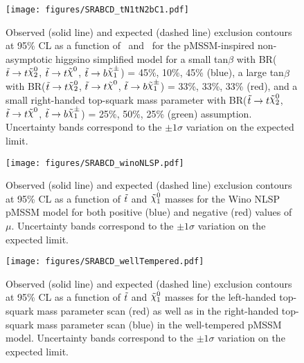\begin{figure}[htpb]
  \begin{center}
   \texttt{[image: figures/SRABCD\_tN1tN2bC1.pdf]}
    \caption[Exclusion contours for the pMSSM-inspired non-asymptotic higgsino simplified model.]{Observed (solid line) and expected (dashed line) exclusion contours at 95\% CL as a function of \mstop\ and \mLSP\ for the pMSSM-inspired non-asymptotic higgsino simplified model for a small tan$\beta$ with BR($\stop\to t\ninotwo$, $\stop\to t\LSP$, $\stop\to b\chinoonepm$) = 45\%, 10\%, 45\% (blue), a large tan$\beta$ with BR($\stop\to t\ninotwo$, $\stop\to t\LSP$, $\stop\to b\chinoonepm$) = 33\%, 33\%, 33\% (red), and a small right-handed top-squark mass parameter with BR($\stop\to t\ninotwo$, $\stop\to t\LSP$, $\stop\to b\chinoonepm$) = 25\%, 50\%, 25\% (green) assumption. Uncertainty bands correspond to the $\pm 1 \sigma$ variation on the expected limit.}
    \label{fig:nonAsymhiggsino_exclusion}
  \end{center}
\end{figure}
\clearpage

\begin{figure}[htpb]
  \begin{center}
    \texttt{[image: figures/SRABCD\_winoNLSP.pdf]}
    \caption[Exclusion contours for the Wino NLSP pMSSM model.]{Observed (solid line) and expected (dashed line) exclusion contours at 95\% CL as a function of $\tilde{t}$ and $\ninoone$ masses for the Wino NLSP pMSSM model for both positive (blue) and negative (red) values of $\mu$. Uncertainty bands correspond to the $\pm 1 \sigma$ variation on the expected limit. %
    }
    \label{fig:winoNLSP_exclusion}
  \end{center}
\end{figure}
\clearpage

\begin{figure}[htpb]
  \begin{center}
    \texttt{[image: figures/SRABCD\_wellTempered.pdf]}
    \caption[Exclusion contour for the well-tempered pMSSM model.]{Observed (solid line) and expected (dashed line) exclusion contours at 95\% CL as a function of $\tilde{t}$ and $\ninoone$ masses for the left-handed top-squark mass parameter scan (red) as well as in the right-handed top-squark mass parameter scan (blue) in the well-tempered pMSSM model. Uncertainty bands correspond to the $\pm 1 \sigma$ variation on the expected limit.} 
    
    \label{fig:wellTemp_exclusion}
  \end{center}
\end{figure}
\clearpage


